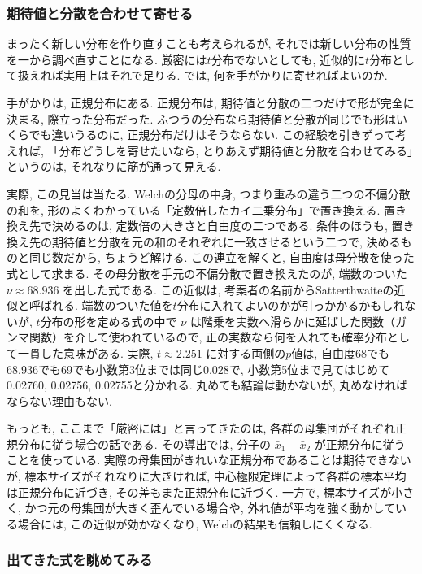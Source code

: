     \subsubsection*{期待値と分散を合わせて寄せる}

    まったく新しい分布を作り直すことも考えられるが, それでは新しい分布の性質を一から調べ直すことになる.
    厳密には$t$分布でないとしても, 近似的に$t$分布として扱えれば実用上はそれで足りる.
    では, 何を手がかりに寄せればよいのか.

    手がかりは, 正規分布にある.
    正規分布は, 期待値と分散の二つだけで形が完全に決まる, 際立った分布だった.
    ふつうの分布なら期待値と分散が同じでも形はいくらでも違いうるのに, 正規分布だけはそうならない.
    この経験を引きずって考えれば, 「分布どうしを寄せたいなら, とりあえず期待値と分散を合わせてみる」というのは, それなりに筋が通って見える.

    実際, この見当は当たる.
    Welchの分母の中身, つまり重みの違う二つの不偏分散の和を, 形のよくわかっている「定数倍したカイ二乗分布」で置き換える.
    置き換え先で決めるのは, 定数倍の大きさと自由度の二つである.
    条件のほうも, 置き換え先の期待値と分散を元の和のそれぞれに一致させるという二つで, 決めるものと同じ数だから, ちょうど解ける.
    この連立を解くと, 自由度は母分散を使った式として求まる.
    その母分散を手元の不偏分散で置き換えたのが, 端数のついた $\nu \approx 68.936$ を出した式である.
    この近似は, 考案者の名前からSatterthwaiteの近似と呼ばれる.
    端数のついた値を$t$分布に入れてよいのかが引っかかるかもしれないが, $t$分布の形を定める式の中で $\nu$ は階乗を実数へ滑らかに延ばした関数（ガンマ関数）を介して使われているので, 正の実数なら何を入れても確率分布として一貫した意味がある.
    実際, $t \approx 2.251$ に対する両側の$p$値は, 自由度68でも68.936でも69でも小数第3位までは同じ0.028で, 小数第5位まで見てはじめて0.02760, 0.02756, 0.02755と分かれる.
    丸めても結論は動かないが, 丸めなければならない理由もない.

    もっとも, ここまで「厳密には」と言ってきたのは, 各群の母集団がそれぞれ正規分布に従う場合の話である.
    その導出では, 分子の $\bar{x}_1 - \bar{x}_2$ が正規分布に従うことを使っている.
    実際の母集団がきれいな正規分布であることは期待できないが, 標本サイズがそれなりに大きければ, 中心極限定理によって各群の標本平均は正規分布に近づき, その差もまた正規分布に近づく.
    一方で, 標本サイズが小さく, かつ元の母集団が大きく歪んでいる場合や, 外れ値が平均を強く動かしている場合には, この近似が効かなくなり, Welchの結果も信頼しにくくなる.

    \subsubsection*{出てきた式を眺めてみる}

